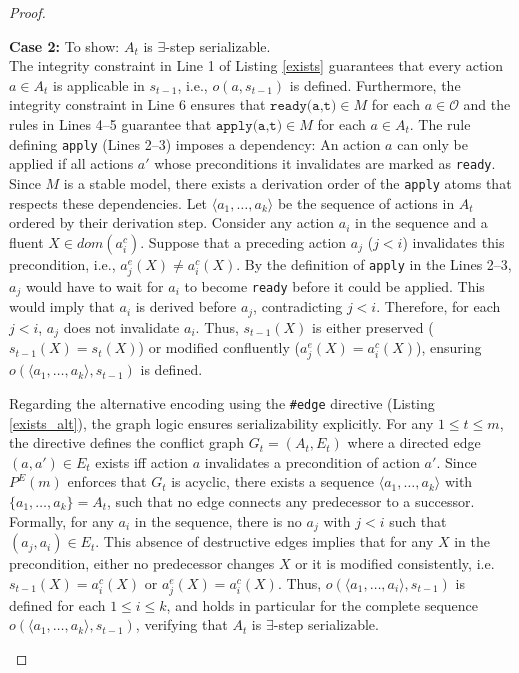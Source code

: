 \documentclass[
     11pt,                    %
     a4paper,             %
     BCOR=10mm,     %
     DIV=14,                 %
     listof=totoc,                    %
     bibliography=totoc,       %
     index=totoc,              %
     parskip            %
     twoside,
     headsepline
     ]{scrreprt}
\theoremstyle{definition}
\theoremstyle{definition}
\theoremstyle{remark}
\theoremstyle{bfnote}
\begin{document}
\begin{proof}
\begin{itemize}
      \textbf{Case 2: } To show: $A_t$ is $\exists$-step serializable. \\
      The integrity constraint in Line 1 of Listing \ref{exists} guarantees that every action $a \in A_t$ is applicable in $s_{t-1}$, i.e., $o(a, s_{t-1})$ is defined.
      Furthermore, the integrity constraint in Line 6 ensures that $\texttt{ready(a,t)} \in M$ for each $a \in \mathcal O$ and the rules in Lines 4--5 guarantee that $\texttt{apply(a,t)} \in M$ for each $a \in A_t$.
      The rule defining \texttt{apply} (Lines 2--3) imposes a dependency: An action $a$ can only be applied if all actions $a'$ whose preconditions it invalidates are marked as \texttt{ready}.
      Since $M$ is a stable model, there exists a derivation order of the \texttt{apply} atoms that respects these dependencies. Let $\langle a_1, \dots, a_k \rangle$ be the sequence of actions in $A_t$ ordered by their derivation step.
      Consider any action $a_i$ in the sequence and a fluent $X \in dom(a_i^c)$.
      Suppose that a preceding action $a_j$ ($j < i$) invalidates this precondition, i.e., $a_j^e(X) \neq a_i^c(X)$.
      By the definition of \texttt{apply} in the Lines 2--3, $a_j$ would have to wait for $a_i$ to become \texttt{ready} before it could be applied. This would imply that $a_i$ is derived before $a_j$, contradicting $j < i$.
      Therefore, for each $j < i$, $a_j$ does not invalidate $a_i$. Thus, $s_{t-1}(X)$ is either preserved ($s_{t-1}(X)=s_t(X)$) or modified confluently ($a_j^e(X) = a_i^c(X)$), ensuring $o(\langle a_1, \dots, a_k \rangle, s_{t-1})$ is defined. 
      
      Regarding the alternative encoding using the \texttt{\#edge} directive (Listing \ref{exists_alt}), the graph logic ensures serializability explicitly.
      For any $1 \le t \le m$, the directive defines the conflict graph $G_t = (A_t, E_t)$ where a directed edge $(a, a') \in E_t$ exists iff action $a$ invalidates a precondition of action $a'$. 
      Since $P^E(m)$ enforces that $G_t$ is acyclic, there exists a sequence $\langle a_1, \dots, a_k\rangle$ with $\{a_1,\dots,a_k\} = A_t$, such that no edge connects any predecessor to a successor. Formally, for any $a_i$ in the sequence, there is no $a_j$ with $j < i$ such that $(a_j, a_i) \in E_t$.
      This absence of destructive edges implies that for any $X$ in the precondition, either no predecessor changes $X$ or it is modified consistently, i.e. $s_{t-1}(X) = a_i^c(X)$ or $a_j^e(X) = a_i^c(X)$.
      Thus, $o(\langle a_1, \dots, a_i \rangle, s_{t-1})$ is defined for each $1 \le i \le k$, and holds in particular for the complete sequence $o(\langle a_1, \dots, a_k \rangle, s_{t-1})$, verifying that $A_t$ is $\exists$-step serializable. \vspace{0.5em}


\end{itemize}
\end{proof}
\end{document}
